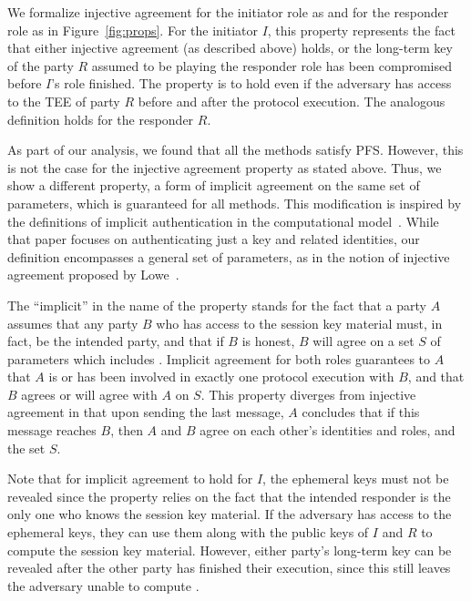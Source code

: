 %
We formalize injective agreement for the initiator role as \mPredInjI{} and
for the responder role as \mPredInjR{} in Figure~\ref{fig:props}.
%
For the initiator $I$, this property represents the fact that either
injective agreement (as described above) holds, or the long-term key of
the party $R$ assumed to be playing the responder role has been
compromised before $I$'s role finished.
%
The property is to hold even if the adversary has access to the TEE of party $R$
before and after the protocol execution.
%
The analogous definition holds for the responder $R$.
%

As part of our analysis, we found that all the \mEdhoc{} methods satisfy PFS.
%
However, this is not the case for the injective agreement property as stated 
above.
%
Thus, we show a different property, a form of implicit agreement on the same
set of parameters, which is guaranteed for all methods.
%
This modification is inspired by the definitions of implicit authentication in
the computational model~\cite{DBLP:conf/csfw/GuilhemFW20}.
%
While that paper focuses on authenticating just a key and related identities,
our definition encompasses a general set of parameters, as in the notion of
injective agreement proposed by Lowe~\cite{DBLP:conf/csfw/Lowe97a}.

The ``implicit'' in the name of the property stands for the fact that a party
$A$ assumes that any party $B$ who has access to the session key material
\mSessKey{} must, in fact, be the intended party, and that if $B$ is honest,
$B$ will agree on a set $S$ of parameters which includes \mSessKey.
%
Implicit agreement for both roles guarantees to $A$ that $A$ is or has been
involved in exactly one protocol execution with $B$, and that $B$ agrees or
will agree with $A$ on $S$.
%
This property diverges from injective agreement in that upon sending
the last message, $A$ concludes that if this message reaches $B$, then $A$
and $B$ agree on each other's identities and roles, and the set $S$.
%

Note that for implicit agreement to hold for $I$, the ephemeral keys must not
be revealed since the property relies on the fact that the intended responder
is the only one who knows the session key material.
%
If the adversary has access to the ephemeral keys, they can use them along 
with
the public keys of $I$ and $R$ to compute the session key material.
%
However, either party's long-term key can be revealed after the other
party has finished their execution, since this still leaves the adversary
unable to compute \mGxy{}.
%

